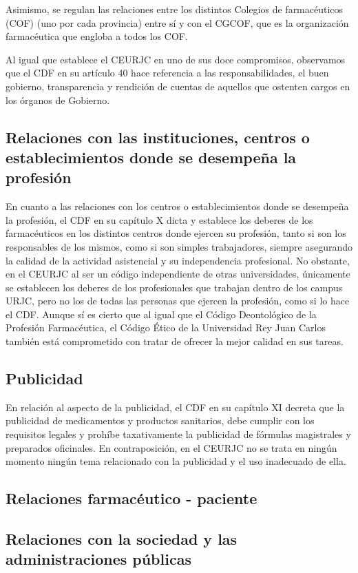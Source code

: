 \documentclass[11pt,a4paper]{article}
\begin{document}
Asimismo, se regulan las relaciones entre los distintos Colegios de farmacéuticos (COF) (uno por cada provincia) entre sí y con el CGCOF, que es la organización farmacéutica que engloba a todos los COF. 

Al igual que establece el CEURJC en uno de sus doce compromisos, observamos que el CDF en su artículo 40 hace referencia a las responsabilidades, el buen gobierno, transparencia y rendición de cuentas de aquellos que ostenten cargos en los órganos de Gobierno.

\subsection{Relaciones con las instituciones, centros o establecimientos donde se desempeña la profesión} 
En cuanto a las relaciones con los centros o establecimientos donde se desempeña la profesión, el CDF en su capítulo X dicta y establece los deberes de los farmacéuticos en los distintos centros donde ejercen su profesión, tanto si son los responsables de los mismos, como si son simples trabajadores, siempre asegurando la calidad de la actividad asistencial y su independencia profesional. No obstante, en el CEURJC al ser un código independiente de otras universidades, únicamente se establecen los deberes de los profesionales que trabajan dentro de los campus URJC, pero no los de todas las personas que ejercen la profesión, como si lo hace el CDF. Aunque sí es cierto que al igual que el Código Deontológico de la Profesión Farmacéutica, el Código Ético de la Universidad Rey Juan Carlos también está comprometido con tratar de ofrecer la mejor calidad en sus tareas.

\subsection{Publicidad}
En relación al aspecto de la publicidad, el CDF en su capítulo XI decreta que la publicidad de medicamentos y productos sanitarios, debe cumplir con los requisitos legales y prohíbe taxativamente la publicidad de fórmulas magistrales y preparados oficinales. En contraposición, en el CEURJC  no se trata en ningún momento ningún tema relacionado con la publicidad y el uso inadecuado de ella.

\subsection{Relaciones farmacéutico - paciente}

\subsection{Relaciones con la sociedad y las administraciones públicas}
\end{document}

